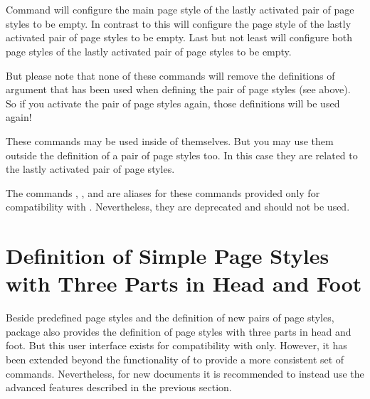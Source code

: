 \begin{Declaration}
  \\
  \\
\end{Declaration}
%
%
%
Command  will configure the main page style
of the lastly activated pair of page styles to be empty. In contrast to this
 will configure the  page
style of the lastly activated pair of page styles to be empty. Last but not
least  will configure both page styles of the
lastly activated pair of page styles to be empty.

But please note that none of these commands will remove
the definitions of argument  that has been used when
defining the pair of page styles (see above). So if you activate the pair of
page styles again, those definitions will be used again!

These commands may be used inside of  themselves. But you
may use them outside the definition of a pair of page styles too. In this case
they are related to the lastly activated pair of page styles.

%
%
%
The commands , , and
 are aliases for these commands provided only for
compatibility with . Nevertheless, they are deprecated and
should not be used.%
%
%
%
%
%
%
%


\section{Definition of Simple Page Styles with Three Parts in Head and Foot }
\label{sec:scrlayer-scrpage-experts.pagestyle.triple}

Beside predefined page styles and the definition of new pairs of page styles,
package  also provides the definition of page styles
with three parts in head and foot. But this user interface exists for
compatibility with  only. However, it has been extended
beyond the functionality of  to provide a more consistent
set of commands. Nevertheless, for new documents it is recommended to instead
use the advanced features described in the previous section.

